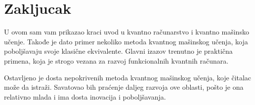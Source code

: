 \documentclass[12pt, letterpaper, oneside]{article}
\begin{document}
\section{Zakljucak}
U ovom sam vam prikazao kraci uvod u kvantno računarstvo i kvantno mašinsko učenje. Takođe je dato primer nekoliko metoda kvantnog mašinskog učenja, 
koja poboljšavaju svoje klasične ekvivalente. Glavni izazov trenutno je praktična primena, koja je strogo vezana za razvoj funkcionalnih kvantnih računara.

Ostavljeno je dosta nepokrivenih metoda kvantnog mašinskog učenja, koje čitalac može da istraži.
Savatovao bih praćenje daljeg razvoja ove oblasti, pošto je ona relativno mlada i ima dosta inovacija i poboljšavanja.

\newpage

\printbibliography
\end{document}
